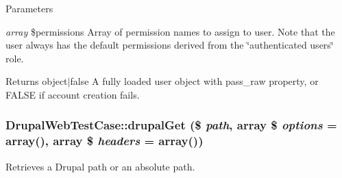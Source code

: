 \begin{DoxyParams}{Parameters}
\item[{\em array}]\$permissions Array of permission names to assign to user. Note that the user always has the default permissions derived from the \char`\"{}authenticated users\char`\"{} role.\end{DoxyParams}
\begin{DoxyReturn}{Returns}
object$|$false A fully loaded user object with pass\_\-raw property, or FALSE if account creation fails. 
\end{DoxyReturn}
\hypertarget{classDrupalWebTestCase_ae282e9e10195fb8dad8a49d1b35e31c9}{
\subsubsection[{drupalGet}]{\setlength{\rightskip}{0pt plus 5cm}DrupalWebTestCase::drupalGet (\$ {\em path}, \/  array \$ {\em options} = {\ttfamily array()}, \/  array \$ {\em headers} = {\ttfamily array()})}}
\label{classDrupalWebTestCase_ae282e9e10195fb8dad8a49d1b35e31c9}
Retrieves a Drupal path or an absolute path.


